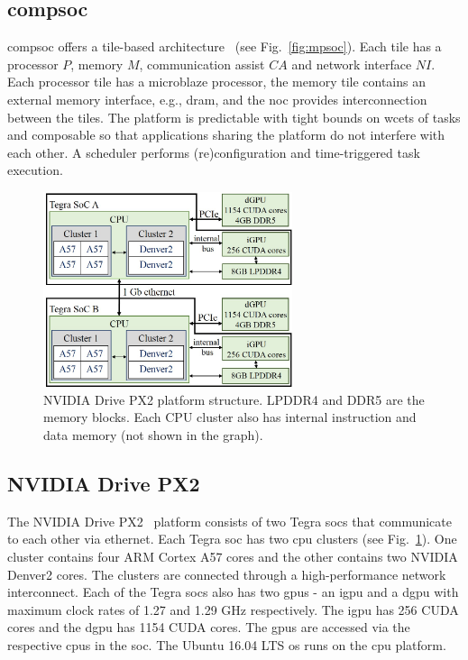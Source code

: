 \subsection{\Gls{compsoc}}
\label{sec:compsoc}
\gls{compsoc} offers a tile-based architecture~\cite{stuijk2007} (see Fig.~\ref{fig:mpsoc}). Each tile has a processor $P$, memory $M$, communication assist $CA$ and network interface $NI$. 
Each processor tile has a microblaze processor, the memory tile contains an external memory interface, e.g., \gls{dram}, and the \gls{noc} provides interconnection between the tiles.
The platform is predictable with tight bounds on \glspl{wcet} of tasks and composable so that applications sharing the platform do not interfere with each other. 
A scheduler performs (re)configuration and time-triggered task execution. 

\begin{figure}[ht]
\centerline{
    \includegraphics[width=0.65\textwidth]{01_intro/images/drive_platform.jpg}
    }
    \caption{NVIDIA Drive PX2 platform structure. LPDDR4 and DDR5 are the memory blocks. Each CPU cluster also has internal instruction and data memory (not shown in the graph).}
    \label{fig:drive_platform}
\end{figure}
\subsection{NVIDIA Drive PX2}
\label{sec:nvidia_px2}
The NVIDIA Drive PX2~\cite{nvidiadrive} platform consists of two Tegra \glspl{soc} that communicate to each other via ethernet. Each Tegra \gls{soc} has two \gls{cpu} clusters (see Fig.~\ref{fig:drive_platform}). One
cluster contains four ARM Cortex A57 cores and the other
contains two NVIDIA Denver2 cores. The clusters are connected
through a high-performance network interconnect. Each of the
Tegra \glspl{soc} also has two \glspl{gpu} -
an \gls{igpu} and a \gls{dgpu} with maximum clock rates of 1.27 and 1.29 GHz respectively. The \gls{igpu} has 256 CUDA cores and the \gls{dgpu} has 1154 CUDA cores. The \glspl{gpu} are accessed via the respective \glspl{cpu} in the \gls{soc}. The Ubuntu 16.04 LTS \gls{os} runs on the \gls{cpu} platform. 

